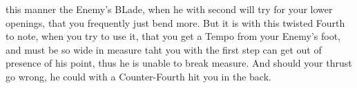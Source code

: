 this manner the Enemy's BLade, when he with second will try for your
lower openings, that you frequently just bend more.
But it is with this twisted Fourth to note, when you try to use it,
that you get a Tempo from your Enemy's foot, and must be so wide in
measure taht you with the first step can get out of presence of his
point, thus he is unable to break measure. And should your thrust go
wrong, he could with a Counter-Fourth hit you in the back.


